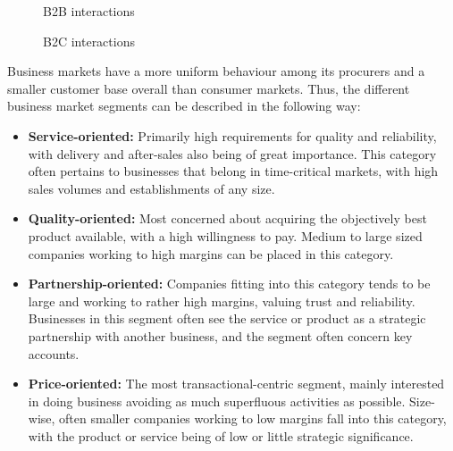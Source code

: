 \begin{figure}
    \centering
    \caption{B2B interactions}
    \label{fig:b2b}
\end{figure}


\begin{figure}
    \centering
    \caption{B2C interactions}
    \label{fig:b2c}
\end{figure}

Business markets have a more uniform behaviour among its procurers and a smaller customer base overall than consumer markets. Thus, the different business market segments can be described in the following way:
\begin{itemize}
    \item \textbf{Service-oriented: }Primarily high requirements for quality and reliability, with delivery and after-sales also being of great importance. This category often pertains to businesses that belong in time-critical markets, with high sales volumes and establishments of any size.
    \item \textbf{Quality-oriented: }Most concerned about acquiring the objectively best product available, with a high willingness to pay. Medium to large sized companies working to high margins can be placed in this category.
    \item \textbf{Partnership-oriented: }Companies fitting into this category tends to be large and working to rather high margins, valuing trust and reliability. Businesses in this segment often see the service or product as a strategic partnership with another business, and the segment often concern key accounts.
    \item \textbf{Price-oriented: }The most transactional-centric segment, mainly interested in doing business avoiding as much superfluous activities as possible. Size-wise, often smaller companies working to low margins fall into this category, with the product or service being of low or little strategic significance.
\end{itemize}


